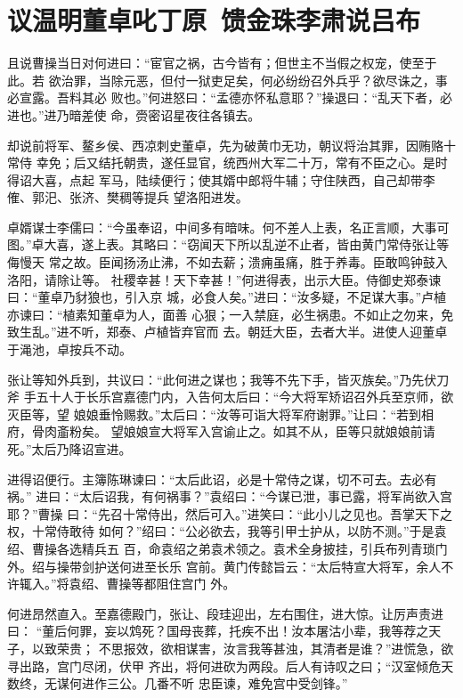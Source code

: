 \chapter{议温明董卓叱丁原~馈金珠李肃说吕布}

且说曹操当日对何进曰：“宦官之祸，古今皆有；但世主不当假之权宠，使至于此。若
欲治罪，当除元恶，但付一狱吏足矣，何必纷纷召外兵乎？欲尽诛之，事必宣露。吾料其必
败也。”何进怒曰：“孟德亦怀私意耶？”操退曰：“乱天下者，必进也。”进乃暗差使
命，赍密诏星夜往各镇去。

却说前将军、鳌乡侯、西凉刺史董卓，先为破黄巾无功，朝议将治其罪，因贿赂十常侍
幸免；后又结托朝贵，遂任显官，统西州大军二十万，常有不臣之心。是时得诏大喜，点起
军马，陆续便行；使其婿中郎将牛辅；守住陕西，自己却带李傕、郭汜、张济、樊稠等提兵
望洛阳进发。

卓婿谋士李儒曰：“今虽奉诏，中间多有暗味。何不差人上表，名正言顺，大事可
图。”卓大喜，遂上表。其略曰：“窃闻天下所以乱逆不止者，皆由黄门常侍张让等侮慢天
常之故。臣闻扬汤止沸，不如去薪；溃痈虽痛，胜于养毒。臣敢鸣钟鼓入洛阳，请除让等。
社稷幸甚！天下幸甚！”何进得表，出示大臣。侍御史郑泰谏曰：“董卓乃豺狼也，引入京
城，必食人矣。”进曰：“汝多疑，不足谋大事。”卢植亦谏曰：“植素知董卓为人，面善
心狠；一入禁庭，必生祸患。不如止之勿来，免致生乱。”进不听，郑泰、卢植皆弃官而
去。朝廷大臣，去者大半。进使人迎董卓于渑池，卓按兵不动。

张让等知外兵到，共议曰：“此何进之谋也；我等不先下手，皆灭族矣。”乃先伏刀斧
手五十人于长乐宫嘉德门内，入告何太后曰：“今大将军矫诏召外兵至京师，欲灭臣等，望
娘娘垂怜赐救。”太后曰：“汝等可诣大将军府谢罪。”让曰：“若到相府，骨肉齑粉矣。
望娘娘宣大将军入宫谕止之。如其不从，臣等只就娘娘前请死。”太后乃降诏宣进。

进得诏便行。主簿陈琳谏曰：“太后此诏，必是十常侍之谋，切不可去。去必有祸。”
进曰：“太后诏我，有何祸事？”袁绍曰：“今谋已泄，事已露，将军尚欲入宫耶？”曹操
曰：“先召十常侍出，然后可入。”进笑曰：“此小儿之见也。吾掌天下之权，十常侍敢待
如何？”绍曰：“公必欲去，我等引甲士护从，以防不测。”于是袁绍、曹操各选精兵五
百，命袁绍之弟袁术领之。袁术全身披挂，引兵布列青琐门外。绍与操带剑护送何进至长乐
宫前。黄门传懿旨云：“太后特宣大将军，余人不许辄入。”将袁绍、曹操等都阻住宫门
外。

何进昂然直入。至嘉德殿门，张让、段珪迎出，左右围住，进大惊。让厉声责进曰：
“董后何罪，妄以鸩死？国母丧葬，托疾不出！汝本屠沽小辈，我等荐之天子，以致荣贵；
不思报效，欲相谋害，汝言我等甚浊，其清者是谁？”进慌急，欲寻出路，宫门尽闭，伏甲
齐出，将何进砍为两段。后人有诗叹之曰；“汉室倾危天数终，无谋何进作三公。几番不听
忠臣谏，难免宫中受剑锋。”

